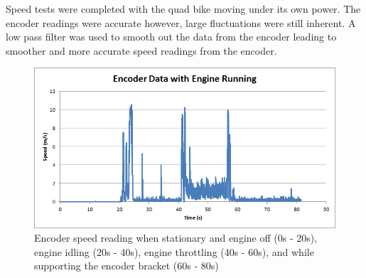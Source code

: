 \documentclass[main.tex]{subfiles}
\begin{document}
Speed tests were completed with the quad bike moving under its own power. The encoder readings were accurate however, large fluctuations were still inherent. A low pass filter was used to smooth out the data from the encoder leading to smoother and more accurate speed readings from the encoder. 
\begin{figure}[ht]
\includegraphics[width=1\textwidth]{5-Testing/Encoder_data_with_engine_running.png}
\centering
\caption{Encoder speed reading when stationary and engine off (0s - 20s), engine idling (20s - 40s), engine throttling (40s - 60s), and while supporting the encoder bracket (60s - 80s)}
\end{figure}
\end{document}
